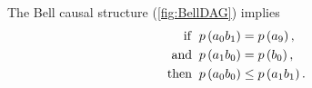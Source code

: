 
\begin{proposition} \label{prop:BellNoGo}
The Bell causal structure (\cref{fig:BellDAG}) implies
\begin{align}
{\rm if  }\;\; &p\left(a_0 b_1\right)=p\left(a_9\right),\label{eq:A0impB1source}\\
{\rm and }\;\; &p\left(a_1 b_0\right)=p\left(b_0\right),\label{eq:B0impA1source}\\
{\rm then }\;\; &p\left(a_0 b_0\right)\leq p\left(a_1 b_1\right) .\label{eq:cabelloresult}
\end{align}
\end{proposition}

